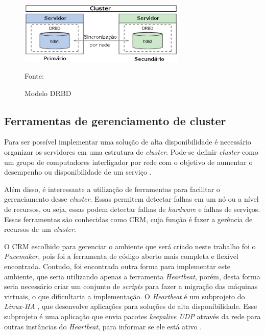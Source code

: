 \begin{figure}[h!]
 \centering
 \includegraphics[width=300px]{img/drbd_basic.eps}
 \caption{Modelo DRBD}
 Fonte: \citet{jones2010}
 \label{fig:drbd_basic}
\end{figure}


\subsection{Ferramentas de gerenciamento de cluster}
\label{section:toolcluster}

Para ser possível implementar uma solução de alta disponibilidade é necessário organizar os servidores em uma estrutura de \textit{cluster}.
Pode-se definir \textit{cluster} como um grupo de computadores interligador por rede com o objetivo de aumentar o desempenho ou disponibilidade
de um serviço \cite{freitas2005}.

Além disso, é interessante a utilização de ferramentas para facilitar o gerenciamento desse \textit{cluster}. Essas permitem detectar falhas em um 
nó ou a nível de recursos, ou seja, essas podem detectar falhas de \textit{hardware} e falhas de serviços. Essas ferramentas são conhecidas 
como \ac{CRM}, cuja função é fazer a gerência de recursos de um \textit{cluster}.

O \ac{CRM} escolhido para gerenciar o ambiente que será criado neste trabalho foi o \textit{Pacemaker}, pois foi a ferramenta de código aberto
mais completa e flexível encontrada. Contudo, foi encontrada outra forma para implementar este ambiente, que seria utilizando apenas a 
ferramenta \textit{Heartbeat}, porém, desta forma seria necessário criar um conjunto de \textit{scripts} para fazer a migração das máquinas 
virtuais, o que dificultaria a implementação.
O \textit{Heartbeat} é um subprojeto do \textit{Linux-HA} \cite{linuxha}, que desenvolve aplicações para soluções de alta disponibilidade.
Esse subprojeto é uma aplicação que envia pacotes \textit{keepalive \ac{UDP}} através da rede para outras instâncias do \textit{Heartbeat}, para
informar se ele está ativo \cite{reis2009}.

